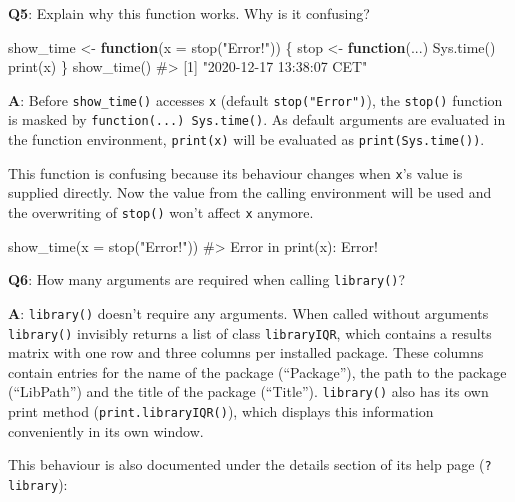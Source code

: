 \documentclass[
]{krantz}
\makeatletter
\newenvironment{Shaded}{\begin{snugshade}}{\end{snugshade}}
\newcommand{\CommentTok}[1]{\textcolor[rgb]{0.56,0.35,0.01}{\textit{#1}}}
\newcommand{\ControlFlowTok}[1]{\textcolor[rgb]{0.13,0.29,0.53}{\textbf{#1}}}
\newcommand{\DataTypeTok}[1]{\textcolor[rgb]{0.13,0.29,0.53}{#1}}
\newcommand{\KeywordTok}[1]{\textcolor[rgb]{0.13,0.29,0.53}{\textbf{#1}}}
\newcommand{\NormalTok}[1]{#1}
\newcommand{\StringTok}[1]{\textcolor[rgb]{0.31,0.60,0.02}{#1}}
\newenvironment{kframe}{%
\medskip{}
\setlength{\fboxsep}{.8em}
 \def\at@end@of@kframe{}%
 \ifinner\ifhmode%
  \def\at@end@of@kframe{\end{minipage}}%
  \begin{minipage}{\columnwidth}%
 \fi\fi%
 \def\FrameCommand##1{\hskip\@totalleftmargin \hskip-\fboxsep
 \colorbox{shadecolor}{##1}\hskip-\fboxsep
     \hskip-\linewidth \hskip-\@totalleftmargin \hskip\columnwidth}%
 \MakeFramed {\advance\hsize-\width
   \@totalleftmargin\z@ \linewidth\hsize
   \@setminipage}}%
 {\par\unskip\endMakeFramed%
 \at@end@of@kframe}
\renewenvironment{Shaded}{\begin{kframe}}{\end{kframe}}
\renewcommand{\KeywordTok} [1]{\textcolor[rgb]{0.00,0.44,0.13}{{#1}}}
\renewcommand{\DataTypeTok}[1]{\textcolor[rgb]{0.56,0.13,0.00}{{#1}}}
\renewcommand{\StringTok}  [1]{\textcolor[rgb]{0.25,0.44,0.63}{{#1}}}
\renewcommand{\CommentTok} [1]{\textcolor[rgb]{0.38,0.63,0.69}{{#1}}}
\renewcommand{\NormalTok}  [1]{{#1}}
\makeatother
\begin{document}
\textbf{{Q5}}: Explain why this function works. Why is it confusing?

\begin{Shaded}
\begin{Highlighting}[]
\NormalTok{show_time <-}\StringTok{ }\ControlFlowTok{function}\NormalTok{(}\DataTypeTok{x =} \KeywordTok{stop}\NormalTok{(}\StringTok{"Error!"}\NormalTok{)) \{}
\NormalTok{  stop <-}\StringTok{ }\ControlFlowTok{function}\NormalTok{(...) }\KeywordTok{Sys.time}\NormalTok{()}
  \KeywordTok{print}\NormalTok{(x)}
\NormalTok{\}}
\KeywordTok{show_time}\NormalTok{()}
\CommentTok{#> [1] "2020-12-17 13:38:07 CET"}
\end{Highlighting}
\end{Shaded}

\textbf{{A}}: Before \texttt{show\_time()} accesses \texttt{x} (default \texttt{stop("Error")}), the \texttt{stop()} function is masked by \texttt{function(...)\ Sys.time()}. As default arguments are evaluated in the function environment, \texttt{print(x)} will be evaluated as \texttt{print(Sys.time())}.

This function is confusing because its behaviour changes when \texttt{x}'s value is supplied directly. Now the value from the calling environment will be used and the overwriting of \texttt{stop()} won't affect \texttt{x} anymore.

\begin{Shaded}
\begin{Highlighting}[]
\KeywordTok{show_time}\NormalTok{(}\DataTypeTok{x =} \KeywordTok{stop}\NormalTok{(}\StringTok{"Error!"}\NormalTok{))}
\CommentTok{#> Error in print(x): Error!}
\end{Highlighting}
\end{Shaded}

\textbf{{Q6}}: How many arguments are required when calling \texttt{library()}?

\textbf{{A}}: \texttt{library()} doesn't require any arguments. When called without arguments \texttt{library()} invisibly returns a list of class \texttt{libraryIQR}, which contains a results matrix with one row and three columns per installed package. These columns contain entries for the name of the package (``Package''), the path to the package (``LibPath'') and the title of the package (``Title''). \texttt{library()} also has its own print method (\texttt{print.libraryIQR()}), which displays this information conveniently in its own window.

This behaviour is also documented under the details section of its help page (\texttt{?library}):
\end{document}
